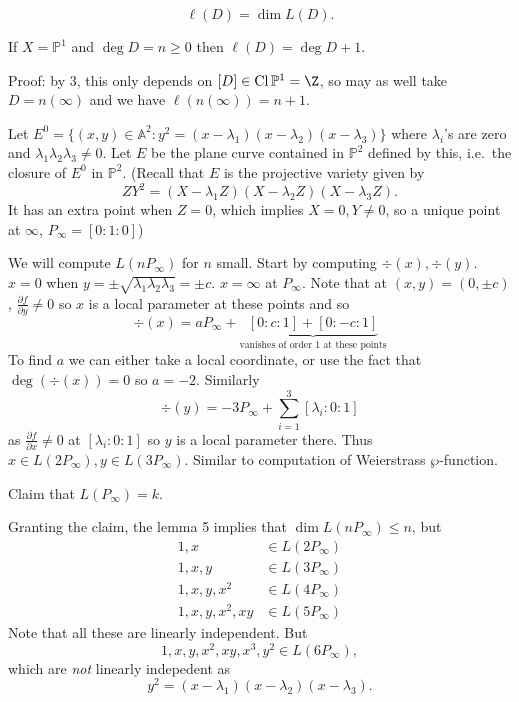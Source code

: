 \documentclass[a4paper]{article}
\renewcommand{\A}{\mathbb{A}}
\DeclareMathOperator{\Cl}{Cl}
\renewcommand*{\P}{\mathbb{P}}
\begin{document}
\begin{definition}
  \[
    \ell(D) = \dim L(D).
  \]
\end{definition}

\begin{eg}
  If \(X = \P^1\) and \(\deg D = n \geq 0\) then \(\ell(D) = \deg D + 1\).

  Proof: by 3, this only depends on \([D] \in \Cl \P^1 = \Z\), so may as well take \(D = n (\infty)\) and we have \(\ell(n (\infty)) = n + 1\).
\end{eg}

\begin{eg}
  Let \(E^0 = \{(x, y) \in \A^2: y^2 = (x - \lambda_1) (x - \lambda_2) (x - \lambda_3)\}\) where \(\lambda_i\)'s are zero and \(\lambda_1 \lambda_2 \lambda_3 \neq 0\). Let \(E\) be the plane curve contained in \(\P^2\) defined by this, i.e.\ the closure of \(E^0\) in \(\P^2\). (Recall that \(E\) is the projective variety given by
  \[
    ZY^2 = (X - \lambda_1Z)(X - \lambda_2Z)(X - \lambda_3Z).
  \]
  It has an extra point when \(Z = 0\), which implies \(X = 0, Y \neq 0\), so a unique point at \(\infty\), \(P_\infty = [0:1:0]\))

  We will compute \(L(nP_\infty)\) for \(n\) small. Start by computing \(\div (x), \div (y)\). \(x = 0\) when \(y = \pm \sqrt{\lambda_1\lambda_2\lambda_3} = \pm c\). \(x = \infty\) at \(P_\infty\). Note that at \((x, y) = (0, \pm c)\), \(\frac{\partial f}{\partial y} \neq 0\) so \(x\) is a local parameter at these points and so
  \[
    \div (x) = a P_\infty + \underbrace{[0:c:1] + [0:-c:1]}_{\text{vanishes of order \(1\) at these points}}
  \]
  To find \(a\) we can either take a local coordinate, or use the fact that \(\deg (\div(x)) = 0\) so \(a = -2\). Similarly
  \[
    \div (y) = -3 P_\infty + \sum_{i = 1}^3 [\lambda_i:0:1]
  \]
  as \(\frac{\partial f}{\partial x} \neq 0\) at \([\lambda_i:0:1]\) so \(y\) is a local parameter there. Thus \(x \in L(2P_\infty), y \in L(3P_\infty)\). Similar to computation of Weierstrass \(\wp\)-function.

  Claim that \(L(P_\infty) = k\).

  Granting the claim, the lemma 5 implies that \(\dim L(nP_\infty) \leq n\), but
  \begin{align*}
    1, x &\in L(2 P_\infty) \\
    1, x, y &\in L(3 P_\infty) \\
    1, x, y, x^2 &\in L(4 P_\infty) \\
    1, x, y, x^2, xy &\in L(5 P_\infty)
  \end{align*}
  Note that all these are linearly independent. But
  \[
    1, x, y, x^2, xy, x^3, y^2 \in L(6 P_\infty),
  \]
  which are \emph{not} linearly indepedent as
  \[
    y^2 = (x - \lambda_1)(x - \lambda_2)(x - \lambda_3).
  \]


\end{eg}
\end{document}
